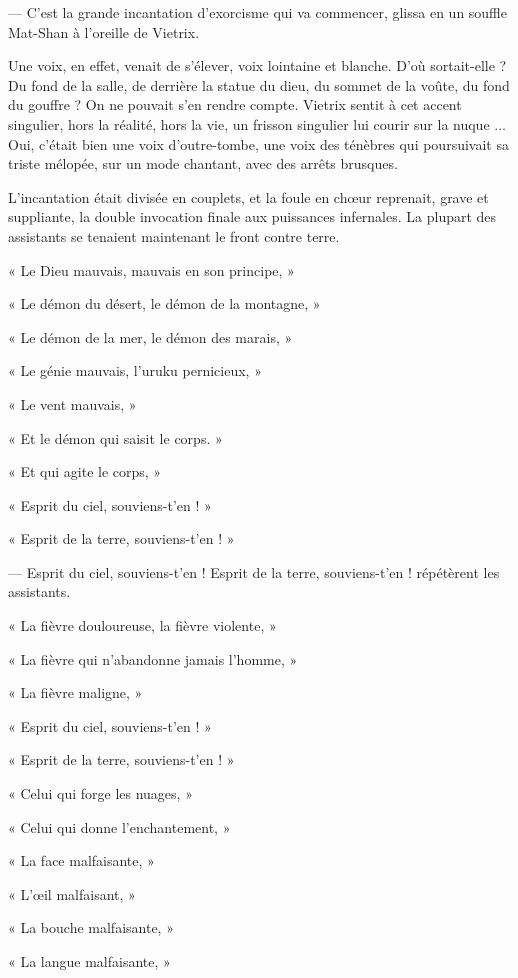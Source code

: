 \documentclass[a4paper, 11pt, oneside, polutonikogreek, french]{article}
\begin{document}
--- C'est la grande incantation d'exorcisme qui va commencer, glissa en un souffle Mat-Shan à l'oreille de Vietrix.

Une voix, en effet, venait de s'élever, voix lointaine et blanche. D'où sortait-elle ? Du fond de la salle, de derrière la statue du dieu, du sommet de la voûte, du fond du gouffre ? On ne pouvait s'en rendre compte. Vietrix sentit à cet accent singulier, hors la réalité, hors la vie, un frisson singulier lui courir sur la nuque ... Oui, c'était bien une voix d'outre-tombe, une voix des ténèbres qui poursuivait sa triste mélopée, sur un mode chantant, avec des arrêts brusques.

L'incantation était divisée en couplets, et la foule en chœur reprenait, grave et suppliante, la double invocation finale aux puissances infernales. La plupart des assistants se tenaient maintenant le front contre terre.

« Le Dieu mauvais, mauvais en son principe, »

« Le démon du désert, le démon de la montagne, »

« Le démon de la mer, le démon des marais, »

« Le génie mauvais, l'uruku pernicieux, »

« Le vent mauvais, »

« Et le démon qui saisit le corps. »

« Et qui agite le corps, »

« Esprit du ciel, souviens-t'en ! »

« Esprit de la terre, souviens-t'en ! »

--- Esprit du ciel, souviens-t'en ! Esprit de la terre, souviens-t'en ! répétèrent les assistants.

« La fièvre douloureuse, la fièvre violente, »

« La fièvre qui n'abandonne jamais l'homme, »

« La fièvre maligne, »

« Esprit du ciel, souviens-t'en ! »

« Esprit de la terre, souviens-t'en ! »

« Celui qui forge les nuages, »

« Celui qui donne l'enchantement, »

« La face malfaisante, »

« L'œil malfaisant, »

« La bouche malfaisante, »

« La langue malfaisante, »
\end{document}
